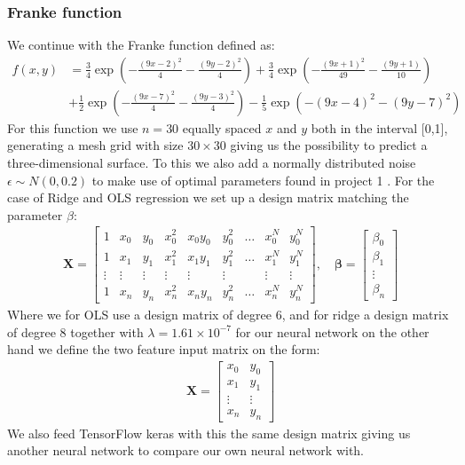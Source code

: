 \documentclass[11pt]{article}
\begin{document}
\subsubsection*{Franke function}
We continue with the Franke function defined as:
\begin{align*}
    f(x,y) & = \frac{3}{4 }\exp\left(- \frac{(9x -2 )^2}{4} - \frac{(9y-2)^2}{4}\right) +\frac{3}{4}\exp{\left(-\frac{(9x+1)^2}{49}- \frac{(9y+1)}{10}\right)} \\
           & +\frac{1}{2}\exp{\left(-\frac{(9x-7)^2}{4} - \frac{(9y-3)^2}{4}\right)} -\frac{1}{5}\exp{\left( -(9x-4)^2 - (9y-7)^2\right) }
\end{align*}
For this function we use $n=30$ equally spaced $x$ and $y$ both in the interval [0,1], generating a mesh grid with size $30 \times 30$ giving us the possibility to predict a three-dimensional surface. To this we also add a normally distributed noise $\epsilon\sim N(0, 0.2)$ to make use of optimal parameters found in project 1 \cite{project1}. For the case of Ridge and OLS regression we set up a design matrix matching the parameter $\beta$:
\begin{align*}
    \boldsymbol{X} = \begin{bmatrix}
        1      & x_0    & y_0    & x_0^2  & x_0y_0 & y_0^2  & \hdots & x_0^N  & y_0^N  \\
        1      & x_1    & y_1    & x_1^2  & x_1y_1 & y_1^2  & \hdots & x_1^N  & y_1^N  \\
        \vdots & \vdots & \vdots & \vdots & \vdots & \vdots &        & \vdots & \vdots \\
        1      & x_n    & y_n    & x_n^2  & x_ny_n & y_n^2  & \hdots & x_n^N  & y_n^N
    \end{bmatrix}
    , \quad
    \boldsymbol{\beta} =
    \begin{bmatrix}
        \beta_0 \\
        \beta_1 \\
        \vdots  \\
        \beta_n
    \end{bmatrix}
\end{align*}
Where we for OLS use a design matrix of degree 6, and for ridge a design matrix of degree 8 together with $\lambda = 1.61 \times10^{-7}$
for our neural network on the other hand we define the two feature input matrix on the form:
\begin{align*}
    \boldsymbol{X} =
    \begin{bmatrix}
        x_0      & y_0    \\
        x_1      & y_1    \\
        \vdots\  & \vdots \\
        x_n      & y_n
    \end{bmatrix}
\end{align*}
We also feed TensorFlow keras with this the same design matrix giving us another neural network to compare our own neural network with.
\end{document}
